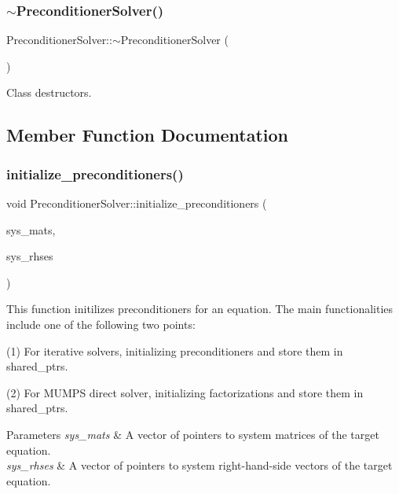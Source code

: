 \subsubsection{\texorpdfstring{$\sim$\+Preconditioner\+Solver()}{~PreconditionerSolver()}}
{\footnotesize\ttfamily Preconditioner\+Solver\+::$\sim$\+Preconditioner\+Solver (\begin{DoxyParamCaption}{ }\end{DoxyParamCaption})}



Class destructors. 



\subsection{Member Function Documentation}
\mbox{\label{class_preconditioner_solver_adfb504161a00566d8adc3534d58b3611}} 
\subsubsection{\texorpdfstring{initialize\+\_\+preconditioners()}{initialize\_preconditioners()}}
{\footnotesize\ttfamily void Preconditioner\+Solver\+::initialize\+\_\+preconditioners (\begin{DoxyParamCaption}\item[{std\+::vector$<$ P\+E\+T\+Sc\+Wrappers\+::\+M\+P\+I\+::\+Sparse\+Matrix $\ast$$>$ \&}]{sys\+\_\+mats,  }\item[{std\+::vector$<$ P\+E\+T\+Sc\+Wrappers\+::\+M\+P\+I\+::\+Vector $\ast$$>$ \&}]{sys\+\_\+rhses }\end{DoxyParamCaption})}

This function initilizes preconditioners for an equation. The main functionalities include one of the following two points\+:

(1) For iterative solvers, initializing preconditioners and store them in shared\+\_\+ptr\textquotesingle{}s.

(2) For M\+U\+M\+PS direct solver, initializing factorizations and store them in shared\+\_\+ptr\textquotesingle{}s.


\begin{DoxyParams}{Parameters}
{\em sys\+\_\+mats} & A vector of pointers to system matrices of the target equation. \\
\hline
{\em sys\+\_\+rhses} & A vector of pointers to system right-\/hand-\/side vectors of the target equation. \\
\hline
\end{DoxyParams}
\mbox{\label{class_preconditioner_solver_a5adc9e36ec12ed148eef7f1120c1bc4e}} 

